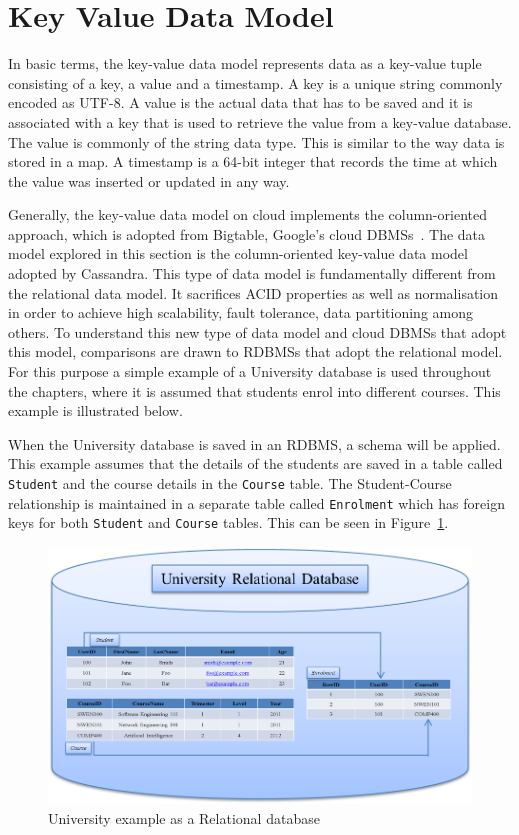 \section{Key Value Data Model}\label{s:key-value-data-model}
In basic terms,   the key-value data model represents data as a key-value tuple
consisting of a key,   a value and a timestamp.  A key is a unique string
commonly encoded as UTF-8.  A value is the actual data that has to be saved and
it is associated with a key that is used to retrieve the value from a key-value
database.  The value is commonly of the string data type.
This is similar to the way data is stored in a map.  A timestamp is a 64-bit
integer that records the time at which the value was inserted or updated in any
way.

Generally,   the key-value data model on cloud implements the column-oriented
approach,   which is adopted from Bigtable,   Google's cloud
\acp{DBMS}~\citep{bigtable}.
The data model explored in this section is the column-oriented key-value data model adopted by Cassandra.  This type of data model is
fundamentally different from the relational data model.  It sacrifices ACID
properties as well as normalisation in order to achieve high scalability,  
fault tolerance,   data partitioning among others.  To understand this new type
of data model and cloud \acp{DBMS} that adopt this model,   comparisons are
drawn to \acp{RDBMS} that adopt the relational model.  For this purpose a simple
example of a University database is used throughout the chapters,   where it is
assumed that students enrol into different courses.  This example is illustrated
below.

When the University database is saved in an \ac{RDBMS},   a schema will be
applied. This example assumes that the details of the students are saved in a
table called \texttt{Student} and the course details in the \texttt{Course}
table. The Student-Course relationship is maintained in a separate table called
\texttt{Enrolment} which has foreign keys for both \texttt{Student} and
\texttt{Course} tables.  This can be seen in Figure~\ref{f:RDB}. 


\begin{figure}[h]
	\centering
	\includegraphics[width=.8\textwidth]{./figure/Example/Relational-DB.png}
	\caption{University example as a Relational database}\label{f:RDB}
\end{figure}

